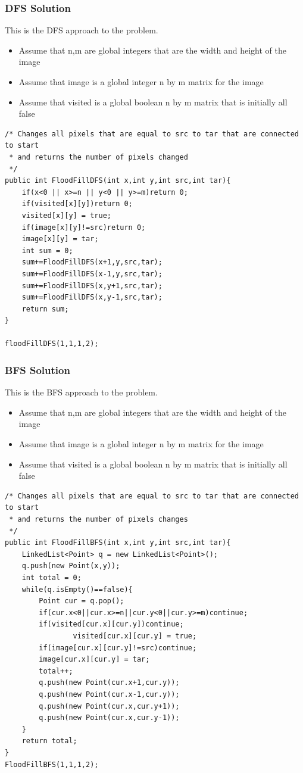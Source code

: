 \documentclass[11pt,oneside]{book}
\begin{document}
\subsubsection{DFS Solution}

This is the DFS approach to the problem.

\begin{itemize}
\item Assume that n,m are global integers that are the width and height of the image
\item Assume that image is a global integer n by m matrix for the image
\item Assume that visited is a global boolean n by m matrix that is initially all false
\end{itemize}

\begin{lstlisting}
/* Changes all pixels that are equal to src to tar that are connected to start
 * and returns the number of pixels changed
 */
public int FloodFillDFS(int x,int y,int src,int tar){
    if(x<0 || x>=n || y<0 || y>=m)return 0;
    if(visited[x][y])return 0;
    visited[x][y] = true;
    if(image[x][y]!=src)return 0;
    image[x][y] = tar;
    int sum = 0;
    sum+=FloodFillDFS(x+1,y,src,tar);
    sum+=FloodFillDFS(x-1,y,src,tar);
    sum+=FloodFillDFS(x,y+1,src,tar);
    sum+=FloodFillDFS(x,y-1,src,tar);
    return sum;
}

floodFillDFS(1,1,1,2);
\end{lstlisting}

\subsubsection{BFS Solution}

This is the BFS approach to the problem.

\begin{itemize}
\item Assume that n,m are global integers that are the width and height of the image
\item Assume that image is a global integer n by m matrix for the image
\item Assume that visited is a global boolean n by m matrix that is initially all false
\end{itemize}

\begin{lstlisting}
/* Changes all pixels that are equal to src to tar that are connected to start
 * and returns the number of pixels changes 
 */
public int FloodFillBFS(int x,int y,int src,int tar){
    LinkedList<Point> q = new LinkedList<Point>();
    q.push(new Point(x,y));
    int total = 0;
    while(q.isEmpty()==false){
        Point cur = q.pop();
        if(cur.x<0||cur.x>=n||cur.y<0||cur.y>=m)continue;
        if(visited[cur.x][cur.y])continue;
                visited[cur.x][cur.y] = true;
        if(image[cur.x][cur.y]!=src)continue;
        image[cur.x][cur.y] = tar;
        total++;
        q.push(new Point(cur.x+1,cur.y));
        q.push(new Point(cur.x-1,cur.y));
        q.push(new Point(cur.x,cur.y+1));
        q.push(new Point(cur.x,cur.y-1));
    }
    return total;
}
FloodFillBFS(1,1,1,2);
\end{lstlisting}
\end{document}
